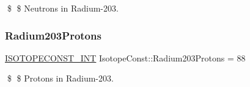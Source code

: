\$ \$ Neutrons in Radium-\/203. \mbox{\label{group___isotope_const-_radium-_ra203_gaec9701da7a508f607cb411e53552ce87}} 
\subsubsection{\texorpdfstring{Radium203\+Protons}{Radium203Protons}}
{\footnotesize\ttfamily \mbox{\hyperlink{group___isotope_const-_macros_ga5f18360b3e99483a35c32d789e62621c}{I\+S\+O\+T\+O\+P\+E\+C\+O\+N\+S\+T\+\_\+\+I\+NT}} Isotope\+Const\+::\+Radium203\+Protons = 88}

\$ \$ Protons in Radium-\/203. 